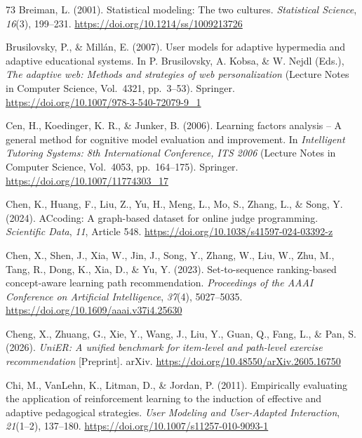 \documentclass[a4paper,preprint,12pt,authoryear]{elsarticle}
\begin{document}
\begin{thebibliography}{73}
Breiman, L. (2001). Statistical modeling: The two cultures. \textit{Statistical Science}, \textit{16}(3), 199--231. \url{https://doi.org/10.1214/ss/1009213726}

Brusilovsky, P., \& Mill{\'a}n, E. (2007). User models for adaptive hypermedia and adaptive educational systems. In P. Brusilovsky, A. Kobsa, \& W. Nejdl (Eds.), \textit{The adaptive web: Methods and strategies of web personalization} (Lecture Notes in Computer Science, Vol.~4321, pp.~3--53). Springer. \url{https://doi.org/10.1007/978-3-540-72079-9_1}

Cen, H., Koedinger, K. R., \& Junker, B. (2006). Learning factors analysis -- A general method for cognitive model evaluation and improvement. In \textit{Intelligent Tutoring Systems: 8th International Conference, ITS 2006} (Lecture Notes in Computer Science, Vol.~4053, pp.~164--175). Springer. \url{https://doi.org/10.1007/11774303_17}

Chen, K., Huang, F., Liu, Z., Yu, H., Meng, L., Mo, S., Zhang, L., \& Song, Y. (2024). ACcoding: A graph-based dataset for online judge programming. \textit{Scientific Data}, \textit{11}, Article 548. \url{https://doi.org/10.1038/s41597-024-03392-z}

Chen, X., Shen, J., Xia, W., Jin, J., Song, Y., Zhang, W., Liu, W., Zhu, M., Tang, R., Dong, K., Xia, D., \& Yu, Y. (2023). Set-to-sequence ranking-based concept-aware learning path recommendation. \textit{Proceedings of the AAAI Conference on Artificial Intelligence}, \textit{37}(4), 5027--5035. \url{https://doi.org/10.1609/aaai.v37i4.25630}

Cheng, X., Zhuang, G., Xie, Y., Wang, J., Liu, Y., Guan, Q., Fang, L., \& Pan, S. (2026). \textit{UniER: A unified benchmark for item-level and path-level exercise recommendation} [Preprint]. arXiv. \url{https://doi.org/10.48550/arXiv.2605.16750}

Chi, M., VanLehn, K., Litman, D., \& Jordan, P. (2011). Empirically evaluating the application of reinforcement learning to the induction of effective and adaptive pedagogical strategies. \textit{User Modeling and User-Adapted Interaction}, \textit{21}(1--2), 137--180. \url{https://doi.org/10.1007/s11257-010-9093-1}


\end{thebibliography}
\end{document}
